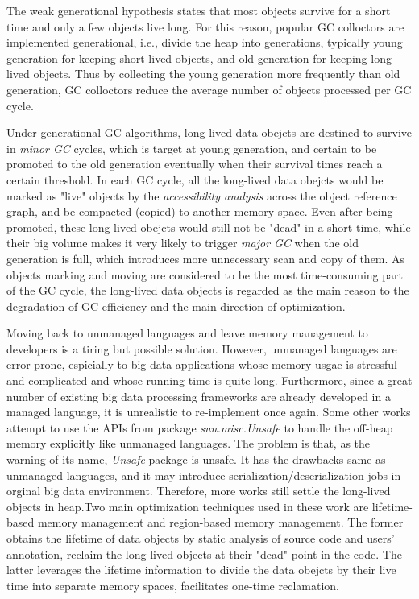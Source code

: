 \documentclass[sigplan, screen]{acmart}
\begin{document}
The weak generational hypothesis states that most objects survive for a short time and only a few objects live long. For this reason, popular GC colloctors
are implemented generational, i.e., divide the heap into generations, typically young generation for keeping short-lived objects, and old
generation for keeping long-lived objects. Thus by collecting the young generation more frequently than old generation, GC colloctors reduce the average number of objects 
processed per GC cycle. 

Under generational GC algorithms, long-lived data obejcts are destined to survive in \emph{minor GC} cycles, which is target at young generation,
and certain to be promoted to the old generation eventually when their survival times reach a certain threshold. In each GC cycle, all the long-lived data obejcts would be marked
as "live" objects by the \emph{accessibility analysis} across the object reference graph, and be compacted (copied) to another memory space. Even after being promoted, these
long-lived obejcts would still not be "dead" in a short time, while their big volume makes it very likely to trigger \emph{major GC} when the old generation is full, 
which introduces more unnecessary scan and copy of them. 
As objects marking and moving are considered to be the most time-consuming part of the GC cycle\cite{suo2018characterizing,yu2016performance}, the long-lived data objects is regarded
as the main reason to the degradation of GC efficiency and the main direction of optimization.

Moving back to unmanaged languages and leave memory management to developers is a tiring but possible solution\cite{chenSM,maas2017return}. However, unmanaged languages are error-prone,
espicially to big data applications whose memory usgae is stressful and complicated and whose running time is quite long. Furthermore, since a great number of existing
big data processing frameworks are already developed in a managed language, it is unrealistic to re-implement once again\cite{nguyen2015facade,bruno2018study}. Some other works
 attempt to use the APIs from package \emph{sun.misc.Unsafe} to handle the off-heap memory explicitly like unmanaged languages\cite{mastrangelo2015use,navasca2019gerenuk,nguyen2015facade}.
 The problem is that, as the warning of its name, \emph{Unsafe} package is unsafe. It has the drawbacks same as unmanaged languages, and it may introduce serialization/deserialization
 jobs in orginal big data environment. Therefore, more works still settle the long-lived objects in heap.Two main optimization techniques used in these work are lifetime-based 
 memory management and region-based memory management. The former obtains the lifetime of data objects by static analysis of source code and users' annotation, reclaim the 
 long-lived objects at their "dead" point in the code. The latter leverages the lifetime information to divide the data obejcts by their live time into separate memory spaces, 
 facilitates one-time reclamation\cite{lu2016lifetime,kolokasis2020say,nguyen2016yak,cohen2015data,wang2019panthera}. 
 
\end{document}

